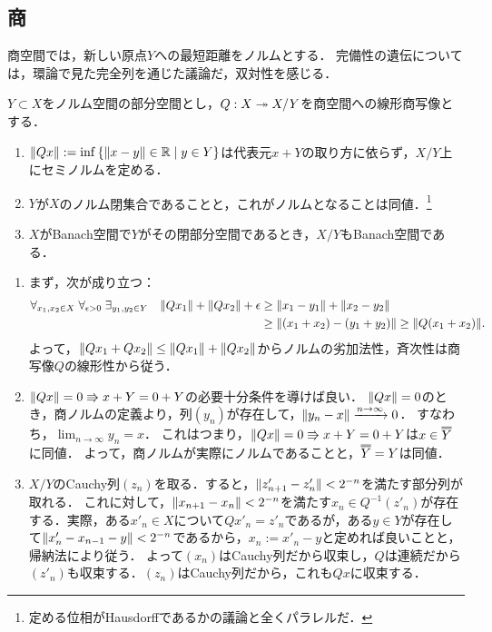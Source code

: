 \documentclass[uplatex,dvipdfmx]{jsreport}
\begin{document}
\subsection{商}

\begin{tcolorbox}[colframe=ForestGreen, colback=ForestGreen!10!white,breakable,colbacktitle=ForestGreen!40!white,coltitle=black,fonttitle=\bfseries\sffamily,
title=]
    商空間では，新しい原点$Y$への最短距離をノルムとする．
    完備性の遺伝については，環論で見た完全列を通じた議論だ，双対性を感じる．
\end{tcolorbox}

\begin{proposition}[商空間]\label{prop-quotient-Banach-space}
    $Y\subset X$をノルム空間の部分空間とし，$Q:X\twoheadrightarrow X/Y$を商空間への線形商写像とする．
    \begin{enumerate}
        \item $\|Qx\|:=\inf\left\{\|x-y\|\in\mathbb{R}\mid y\in Y\right\}$は代表元$x+Y$の取り方に依らず，$X/Y$上にセミノルムを定める．
        \item $Y$が$X$のノルム閉集合であることと，これがノルムとなることは同値．\footnote{定める位相がHausdorffであるかの議論と全くパラレルだ．}
        \item $X$がBanach空間で$Y$がその閉部分空間であるとき，$X/Y$もBanach空間である．
    \end{enumerate}
\end{proposition}
\begin{Proof}\mbox{}
    \begin{enumerate}
        \item まず，次が成り立つ：
        \begin{align*}
            \forall_{x_1,x_2\in X}\;\forall_{\epsilon>0}\;\exists_{y_1,y_2\in Y}\quad\|Qx_1\|+\|Qx_2\|+\epsilon&\ge\|x_1-y_1\|+\|x_2-y_2\|\\
            &\ge\|(x_1+x_2)-(y_1+y_2)\|\ge\|Q(x_1+x_2)\|.
        \end{align*}
        よって，$\|Qx_1+Qx_2\|\le\|Qx_1\|+\|Qx_2\|$からノルムの劣加法性，斉次性は商写像$Q$の線形性から従う．
        \item $\|Qx\|=0\Rrightarrow x+Y=0+Y$の必要十分条件を導けば良い．
        $\|Qx\|=0$のとき，商ノルムの定義より，列$(y_n)$が存在して，$\|y_n-x\|\xrightarrow{n\to\infty}0$．
        すなわち，$\lim_{n\to\infty}y_n=x$．
        これはつまり，$\|Qx\|=0\Rrightarrow x+Y=0+Y$は$x\in\oo{Y}$に同値．
        よって，商ノルムが実際にノルムであることと，$\oo{Y}=Y$は同値．
        \item $X/Y$のCauchy列$(z_n)$を取る．すると，$\|z'_{n+1}-z'_n\|<2^{-n}$を満たす部分列が取れる．
        これに対して，$\|x_{n+1}-x_n\|<2^{-n}$を満たす$x_n\in Q^{-1}(z'_n)$が存在する．実際，ある$x'_n\in X$について$Qx'_n=z'_n$であるが，ある$y\in Y$が存在して$\|x'_n-x_{n-1}-y\|<2^{-n}$であるから，$x_n:=x'_n-y$と定めれば良いことと，帰納法により従う．
        よって$(x_n)$はCauchy列だから収束し，$Q$は連続だから$(z'_n)$も収束する．$(z_n)$はCauchy列だから，これも$Qx$に収束する．
    \end{enumerate}
\end{Proof}
\end{document}
